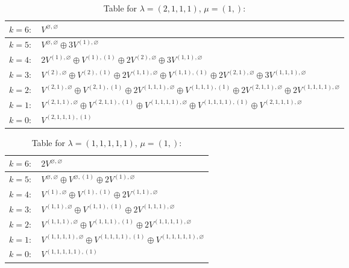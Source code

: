 \documentclass[a4paper,12pt]{article}
\begin{document}
\renewcommand{\arraystretch}{1.6} 
\begin{table}[H]
\centering
\caption{Table for $\lambda = (2, 1, 1, 1)$, $\mu = (1,)$:}
\begin{tabular}{|>{\centering\arraybackslash}p{15cm}|}
\hline
 $k = 6: \quad V^{\varnothing, \varnothing} $ \\ \hline
 $k = 5: \quad V^{\varnothing, \varnothing} \oplus 3 V^{(1), \varnothing} $ \\ \hline
 $k = 4: \quad 2 V^{(1), \varnothing} \oplus V^{(1), (1)} \oplus 2 V^{(2), \varnothing} \oplus 3 V^{(1, 1), \varnothing} $ \\ \hline
 $k = 3: \quad V^{(2), \varnothing} \oplus V^{(2), (1)} \oplus 2 V^{(1, 1), \varnothing} \oplus V^{(1, 1), (1)} \oplus 2 V^{(2, 1), \varnothing} \oplus 3 V^{(1, 1, 1), \varnothing} $ \\ \hline
 $k = 2: \quad V^{(2, 1), \varnothing} \oplus V^{(2, 1), (1)} \oplus 2 V^{(1, 1, 1), \varnothing} \oplus V^{(1, 1, 1), (1)} \oplus 2 V^{(2, 1, 1), \varnothing} \oplus 2 V^{(1, 1, 1, 1), \varnothing} $ \\ \hline
 $k = 1: \quad V^{(2, 1, 1), \varnothing} \oplus V^{(2, 1, 1), (1)} \oplus V^{(1, 1, 1, 1), \varnothing} \oplus V^{(1, 1, 1, 1), (1)} \oplus V^{(2, 1, 1, 1), \varnothing} $ \\ \hline
 $k = 0: \quad V^{(2, 1, 1, 1), (1)} $ \\ \hline
\end{tabular}
\end{table}

\renewcommand{\arraystretch}{1.6} 
\begin{table}[H]
\centering
\caption{Table for $\lambda = (1, 1, 1, 1, 1)$, $\mu = (1,)$:}
\begin{tabular}{|>{\centering\arraybackslash}p{15cm}|}
\hline
 $k = 6: \quad 2 V^{\varnothing, \varnothing} $ \\ \hline
 $k = 5: \quad V^{\varnothing, \varnothing} \oplus V^{\varnothing, (1)} \oplus 2 V^{(1), \varnothing} $ \\ \hline
 $k = 4: \quad V^{(1), \varnothing} \oplus V^{(1), (1)} \oplus 2 V^{(1, 1), \varnothing} $ \\ \hline
 $k = 3: \quad V^{(1, 1), \varnothing} \oplus V^{(1, 1), (1)} \oplus 2 V^{(1, 1, 1), \varnothing} $ \\ \hline
 $k = 2: \quad V^{(1, 1, 1), \varnothing} \oplus V^{(1, 1, 1), (1)} \oplus 2 V^{(1, 1, 1, 1), \varnothing} $ \\ \hline
 $k = 1: \quad V^{(1, 1, 1, 1), \varnothing} \oplus V^{(1, 1, 1, 1), (1)} \oplus V^{(1, 1, 1, 1, 1), \varnothing} $ \\ \hline
 $k = 0: \quad V^{(1, 1, 1, 1, 1), (1)} $ \\ \hline
\end{tabular}
\end{table}
\end{document}
